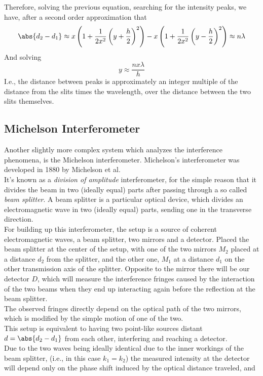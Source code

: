 \documentclass[../electromagnetism.tex]{subfiles}
\begin{document}
Therefore, solving the previous equation, searching for the intensity peaks, we have, after a second order approximation that
\begin{equation*}
	\abs{d_2-d_1}\approx x\left( 1+\frac{1}{2x^2}\left( y+\frac{h}{2} \right)^2 \right)-x\left( 1+\frac{1}{2x^2}\left( y-\frac{h}{2} \right)^2 \right)\approx n\lambda
\end{equation*}
And solving 
\begin{equation}
	y\approx\frac{nx\lambda}{h}
	\label{eq:peakdistanceapprox}
\end{equation}
I.e., the distance between peaks is approximately an integer multiple of the distance from the slits times the wavelength, over the distance between the two slits themselves.
\subsection{Michelson Interferometer}
Another slightly more complex system which analyzes the interference phenomena, is the Michelson interferometer. Michelson's interferometer was developed in 1880 by Michelson et al.\\
It's known as a \emph{division of amplitude} interferometer, for the simple reason that it divides the beam in two (ideally equal) parts after passing through a so called \emph{beam splitter}. A beam splitter is a particular optical device, which divides an electromagnetic wave in two (ideally equal) parts, sending one in the transverse direction.\\
For building up this interferometer, the setup is a source of coherent electromagnetic waves, a beam splitter, two mirrors and a detector. Placed the beam splitter at the center of the setup, with one of the two mirrors $M_2$ placed at a distance $d_2$ from the splitter, and the other one, $M_1$ at a distance $d_1$ on the other transmission axis of the splitter. Opposite to the mirror there will be our detector $D$, which will measure the interference fringes caused by the interaction of the two beams when they end up interacting again before the reflection at the beam splitter.\\
The observed fringes directly depend on the optical path of the two mirrors, which is modified by the simple motion of one of the two.\\
This setup is equivalent to having two point-like sources distant $d=\abs{d_2-d_1}$ from each other, interfering and reaching a detector.\\
Due to the two waves being ideally identical due to the inner workings of the beam splitter, (i.e., in this case $k_1=k_2$) the measured intensity at the detector will depend only on the phase shift induced by the optical distance traveled, and 
\end{document}
